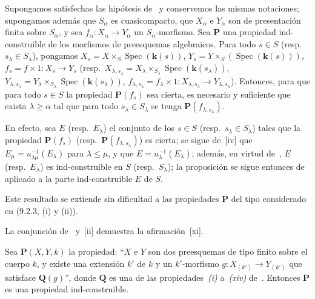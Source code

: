 \begin{proposition}[9.3.3]
\label{IV.9.3.3}
Supongamos satisfechas las hipótesis de~ y conservemos las mismas notaciones; supongamos además que $S_\alpha$ es cuasicompacto, que $X_\alpha$ e $Y_\alpha$ son de presentación finita sobre $S_\alpha$, y sea $f_\alpha:X_\alpha\to Y_\alpha$ un $S_\alpha$-morfismo.
Sea $\boldsymbol{P}$ una propiedad ind-construible de los morfismos de preesquemas algebraicos.
Para todo $s\in S$ \textnormal{(resp.}\ $s_\lambda\in S_\lambda$\textnormal{)}, pongamos $X_s=X\times_S\operatorname{Spec}(\boldsymbol{k}(s))$, $Y_s=Y\times_S(\operatorname{Spec}(\boldsymbol{k}(s)))$, $f_s=f\times1:X_s\to Y_s$ \textnormal{(resp.}\ $X_{\lambda,s_\lambda}=X_\lambda\times_{S_\lambda}
\operatorname{Spec}(\boldsymbol{k}(s_\lambda))$, $Y_{\lambda,s_\lambda}=Y_\lambda\times_{S_\lambda}
\operatorname{Spec}(\boldsymbol{k}(s_\lambda))$, $f_{\lambda,s_\lambda}=f_\lambda\times1:
X_{\lambda,s_\lambda}\to Y_{\lambda,s_\lambda}$\textnormal{)}.
Entonces, para que para todo $s\in S$ la propiedad $\boldsymbol{P}(f_s)$ sea cierta, es necesario y suficiente que exista $\lambda\geqslant\alpha$ tal que para todo $s_\lambda\in S_\lambda$ se tenga $\boldsymbol{P}(f_{\lambda,s_\lambda})$.
\end{proposition}

En efecto, sea $E$ (resp.\ $E_\lambda$) el conjunto de los $s\in S$ (resp.\ $s_\lambda\in S_\lambda$) tales que la propiedad $\boldsymbol{P}(f_s)$ (resp.\ $\boldsymbol{P}(f_{\lambda,s_\lambda})$) es cierta; se sigue de~[iv] que $E_\mu=u_{\lambda\mu}^{-1}(E_\lambda)$ para $\lambda\leqslant\mu$, y que $E=u_\lambda^{-1}(E_\lambda)$; además, en virtud de~, $E$ (resp.\ $E_\lambda$) es ind-construible en $S$ (resp.\ $S_\lambda$); la proposición se sigue entonces de~ aplicado a la parte ind-construible $E$ de $S$.


Este resultado se extiende sin dificultad a las propiedades $\boldsymbol{P}$ del tipo considerado en (9.2.3, (i) y (ii)).

\begin{remark}[9.3.4]
\label{IV.9.3.4}
La conjunción de~ y~[ii] demuestra la afirmación~[xi].
\end{remark}

\begin{proposition}[9.3.5]
\label{IV.9.3.5}
Sea $\boldsymbol{P}(X,Y,k)$ la propiedad: ``$X$ e $Y$ son dos preesquemas de tipo finito sobre el cuerpo $k$, y existe una extensión $k'$ de $k$ y un $k'$-morfismo $g:X_{(k')}\to Y_{(k')}$ que satisface $\boldsymbol{Q}(g)$'', donde $\boldsymbol{Q}$ es una de las propiedades~\emph{(i)} a~\emph{(xiv)} de~.
Entonces $\boldsymbol{P}$ es una propiedad ind-construible.
\end{proposition}

